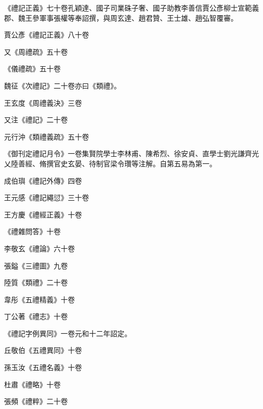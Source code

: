 \begin{pinyinscope}
 《禮記正義》七十卷孔穎達、國子司業硃子奢、國子助教李善信賈公彥柳士宣範義郡、魏王參軍事張權等奉詔撰，與周玄達、趙君贊、王士雄、趙弘智覆審。



 賈公彥《禮記正義》八十卷



 又《周禮疏》五十卷



 《儀禮疏》五十卷



 魏征《次禮記》二十卷亦曰《類禮》。



 王玄度《周禮義決》三卷



 又注《禮記》二十卷



 元行沖《類禮義疏》五十卷



 《御刊定禮記月令》一卷集賢院學士李林甫、陳希烈、徐安貞、直學士劉光謙齊光乂陸善經、脩撰官史玄晏、待制官梁令瓚等注解。自第五易為第一。



 成伯璵《禮記外傳》四卷



 王元感《禮記繩愆》三十卷



 王方慶《禮經正義》十卷



 《禮雜問答》十卷



 李敬玄《禮論》六十卷



 張鎰《三禮圖》九卷



 陸質《類禮》二十卷



 韋彤《五禮精義》十卷



 丁公著《禮志》十卷



 《禮記字例異同》一卷元和十二年詔定。



 丘敬伯《五禮異同》十卷



 孫玉汝《五禮名義》十卷



 杜肅《禮略》十卷



 張頻《禮粹》二十卷




\end{pinyinscope}
